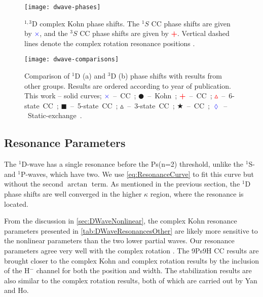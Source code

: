 \documentclass[Dissertation.tex]{subfiles}
\begin{document}
\begin{figure}[H]
	\centering
	\texttt{[image: dwave-phases]}
	\caption[$^{1,3}$D phase shifts]{$^{1,3}$D complex Kohn phase shifts. The $^1S$ CC phase shifts
\cite{Walters2004} are given by \mbox{\textcolor{blue}{$\times$}}, and the
$^3S$ CC phase shifts \cite{Blackwood2002} are given by
\mbox{\textcolor{red}{\textbf{+}}}. Vertical dashed lines denote the complex rotation resonance
positions \cite{Ho1998}.}
	\label{fig:DWavePhase}
\end{figure}

\begin{figure}[H]
	\centering
	\texttt{[image: dwave-comparisons]}
	\caption[Comparison of D-wave phase shifts]{Comparison of $^1$D (a) and $^3$D (b) phase shifts with results from other groups. Results are ordered according to year of publication. This work -- solid curves; \mbox{\textcolor{blue}{$\times$} -- CC \cite{Walters2004};} \mbox{$\CIRCLE$ -- Kohn \cite{VanReeth2003};} \mbox{\textcolor{red}{\textbf{+}} -- CC \cite{Blackwood2002};} \mbox{\textcolor{red}{$\vartriangle$} -- 6-state CC \cite{Sinha2000};} \mbox{$\blacksquare$ -- 5-state CC \cite{Adhikari1999};} \mbox{$\vartriangle$ -- 3-state CC \cite{Sinha1997};} \mbox{\textcolor[RGB]{0,127,0}{$\bigstar$} -- CC \cite{Ray1997};} \mbox{\textcolor{blue}{$\lozenge$} -- Static-exchange \cite{Hara1975}.}}
	\label{fig:DWaveComparisons}
\end{figure}


\subsection{Resonance Parameters}
\label{sec:DWaveResonance}

The $^1$D-wave has a single resonance before the Ps(n=2) threshold, unlike 
the $^1$S- and $^1$P-waves, which have two. We use \cref{eq:ResonanceCurve}
to fit this curve but without the second $\arctan$ term.
As mentioned in the previous section, the $^1$D phase shifts are
well converged in the higher $\kappa$ region, where the resonance
is located.

From the discussion in \cref{sec:DWaveNonlinear}, the complex Kohn resonance 
parameters presented in \cref{tab:DWaveResonancesOther} are likely more 
sensitive to the nonlinear parameters than the two lower partial waves. Our 
resonance parameters agree very well with the complex rotation \cite{Ho1998}.
The 9Ps9H CC results \cite{Blackwood2002} are brought closer to the complex
Kohn and complex rotation results by the inclusion of the H$^-$ channel for
both the position and width. The stabilization \cite{Yan2003} results are
also similar to the complex rotation results, both of which are carried out by
Yan and Ho.
\end{document}
